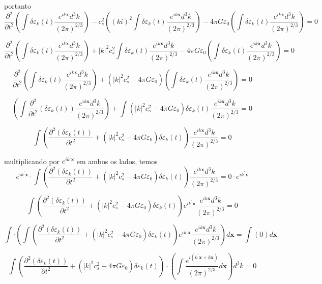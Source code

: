 \documentclass[a4paper,12pt]{article}
\begin{document}
portanto
$$\dfrac{\partial^2 }{\partial t^2}\left(\int \delta\varepsilon_k (t)  \dfrac{e^{ik\textbf{x}}d^3 k}{(2\pi)^{2/3}} \right)  - c^2_s \left((ki)^2\int  \delta\varepsilon_k (t) \dfrac{e^{ik\textbf{x}}d^3 k}{(2\pi)^{2/3}}\right) - 4\pi G\varepsilon_0  \left(\int \delta\varepsilon_k (t)  \dfrac{e^{ik\textbf{x}}d^3 k}{(2\pi)^{2/3}} \right) = 0$$

$$\dfrac{\partial^2 }{\partial t^2}\left(\int \delta\varepsilon_k (t)  \dfrac{e^{ik\textbf{x}}d^3 k}{(2\pi)^{2/3}} \right)  + |k|^2c^2_s\int  \delta\varepsilon_k (t) \dfrac{e^{ik\textbf{x}}d^3 k}{(2\pi)^{2/3}} - 4\pi G\varepsilon_0  \left(\int \delta\varepsilon_k (t)  \dfrac{e^{ik\textbf{x}}d^3 k}{(2\pi)^{2/3}} \right) = 0$$

$$\dfrac{\partial^2 }{\partial t^2} \left(\int \delta\varepsilon_k (t)  \dfrac{e^{ik\textbf{x}}d^3 k}{(2\pi)^{2/3}} \right) + (|k|^2c^2_s - 4\pi G\varepsilon_0)  \left(\int \delta\varepsilon_k (t)  \dfrac{e^{ik\textbf{x}}d^3 k}{(2\pi)^{2/3}} \right) = 0$$

$$ \left(\int \dfrac{\partial^2 }{\partial t^2}( \delta\varepsilon_k (t))  \dfrac{e^{ik\textbf{x}}d^3 k}{(2\pi)^{2/3}} \right) + \int (|k|^2c^2_s - 4\pi G\varepsilon_0)\delta\varepsilon_k (t) \dfrac{ e^{ik\textbf{x}}d^3 k}{(2\pi)^{2/3}} = 0$$

$$ \int \left(\dfrac{\partial^2 (\delta\varepsilon_k (t))}{\partial t^2} +(|k|^2c^2_s - 4\pi G\varepsilon_0)\delta\varepsilon_k (t)\right)  \dfrac{e^{ik\textbf{x}}d^3 k}{(2\pi)^{2/3}} = 0$$

multiplicando por $e^{i k^\prime \textbf{x}}$ em ambos os lados, temos
$$ e^{i k^\prime \textbf{x}} \cdot \int \left(\dfrac{\partial^2 (\delta\varepsilon_k (t))}{\partial t^2} +(|k|^2c^2_s - 4\pi G\varepsilon_0)\delta\varepsilon_k (t)\right)\dfrac{e^{ik\textbf{x}}d^3 k}{(2\pi)^{2/3}} = 0 \cdot  e^{i k^\prime \textbf{x}}$$

$$ \int \left(\dfrac{\partial^2 (\delta\varepsilon_k (t))}{\partial t^2} +(|k|^2c^2_s - 4\pi G\varepsilon_0)\delta\varepsilon_k (t)\right) e^{i k^\prime \textbf{x}}  \dfrac{e^{ik\textbf{x}}d^3 k}{(2\pi)^{2/3}} = 0$$

$$ \int \cdot \left(\int \left(\dfrac{\partial^2 (\delta\varepsilon_k (t))}{\partial t^2} +(|k|^2c^2_s - 4\pi G\varepsilon_0)\delta\varepsilon_k (t)\right) e^{i k^\prime \textbf{x}}  \dfrac{e^{ik\textbf{x}}d^3 k}{(2\pi)^{2/3}}\right) d\textbf{x} =\int \left( 0 \right) d\textbf{x}$$

$$  \int \left(\dfrac{\partial^2 (\delta\varepsilon_k (t))}{\partial t^2} +(|k|^2c^2_s - 4\pi G\varepsilon_0)\delta\varepsilon_k (t)\right)\cdot \left(\int \dfrac{e^{ i (k^\prime \textbf{x} +  k\textbf{x}) }}{(2\pi)^{2/3}}d\textbf{x}\right) d^3k   =0$$
\end{document}
